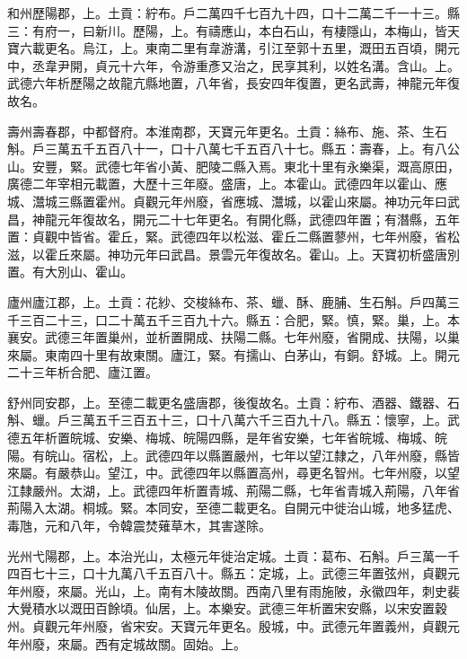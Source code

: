 \begin{pinyinscope}
 和州歷陽郡，上。土貢：紵布。戶二萬四千七百九十四，口十二萬二千一十三。縣三：有府一，曰新川。歷陽，上。有禱應山，本白石山，有棲隱山，本梅山，皆天寶六載更名。烏江，上。東南二里有韋游溝，引江至郭十五里，溉田五百頃，開元中，丞韋尹開，貞元十六年，令游重彥又治之，民享其利，以姓名溝。含山。上。武德六年析歷陽之故龍亢縣地置，八年省，長安四年復置，更名武壽，神龍元年復故名。



 壽州壽春郡，中都督府。本淮南郡，天寶元年更名。土貢：絲布、施、茶、生石斛。戶三萬五千五百八十一，口十八萬七千五百八十七。縣五：壽春，上。有八公山。安豐，緊。武德七年省小黃、肥陵二縣入焉。東北十里有永樂渠，溉高原田，廣德二年宰相元載置，大歷十三年廢。盛唐，上。本霍山。武德四年以霍山、應城、灊城三縣置霍州。貞觀元年州廢，省應城、灊城，以霍山來屬。神功元年曰武昌，神龍元年復故名，開元二十七年更名。有開化縣，武德四年置；有潛縣，五年置：貞觀中皆省。霍丘，緊。武德四年以松滋、霍丘二縣置蓼州，七年州廢，省松滋，以霍丘來屬。神功元年曰武昌。景雲元年復故名。霍山。上。天寶初析盛唐別置。有大別山、霍山。



 廬州廬江郡，上。土貢：花紗、交梭絲布、茶、蠟、酥、鹿脯、生石斛。戶四萬三千三百二十三，口二十萬五千三百九十六。縣五：合肥，緊。慎，緊。巢，上。本襄安。武德三年置巢州，並析置開成、扶陽二縣。七年州廢，省開成、扶陽，以巢來屬。東南四十里有故東關。廬江，緊。有擩山、白茅山，有銅。舒城。上。開元二十三年析合肥、廬江置。



 舒州同安郡，上。至德二載更名盛唐郡，後復故名。土貢：紵布、酒器、鐵器、石斛、蠟。戶三萬五千三百五十三，口十八萬六千三百九十八。縣五：懷寧，上。武德五年析置皖城、安樂、梅城、皖陽四縣，是年省安樂，七年省皖城、梅城、皖陽。有皖山。宿松，上。武德四年以縣置嚴州，七年以望江隸之，八年州廢，縣皆來屬。有嚴恭山。望江，中。武德四年以縣置高州，尋更名智州。七年州廢，以望江隸嚴州。太湖，上。武德四年析置青城、荊陽二縣，七年省青城入荊陽，八年省荊陽入太湖。桐城。緊。本同安，至德二載更名。自開元中徙治山城，地多猛虎、毒虺，元和八年，令韓震焚薙草木，其害遂除。



 光州弋陽郡，上。本治光山，太極元年徙治定城。土貢：葛布、石斛。戶三萬一千四百七十三，口十九萬八千五百八十。縣五：定城，上。武德三年置弦州，貞觀元年州廢，來屬。光山，上。南有木陵故關。西南八里有雨施陂，永徽四年，刺史裴大覺積水以溉田百餘頃。仙居，上。本樂安。武德三年析置宋安縣，以宋安置穀州。貞觀元年州廢，省宋安。天寶元年更名。殷城，中。武德元年置義州，貞觀元年州廢，來屬。西有定城故關。固始。上。




\end{pinyinscope}
